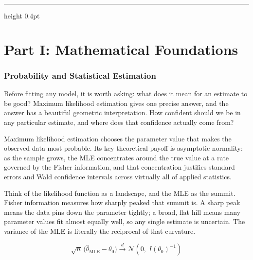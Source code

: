 \documentclass[12pt,a4paper]{article}
\begin{document}
\vspace{10pt}
\hrule height 0.4pt
\vspace{14pt}

\part*{Part I: Mathematical Foundations}

\section*{Probability and Statistical Estimation}

Before fitting any model, it is worth asking: what does it mean for an
estimate to be good? Maximum likelihood estimation gives one precise answer,
and the answer has a beautiful geometric interpretation. How confident should
we be in any particular estimate, and where does that confidence actually
come from?

\begin{concept}
Maximum likelihood estimation chooses the parameter value that makes the
observed data most probable. Its key theoretical payoff is asymptotic
normality: as the sample grows, the MLE concentrates around the true value
at a rate governed by the Fisher information, and that concentration
justifies standard errors and Wald confidence intervals across virtually
all of applied statistics.
\end{concept}

\begin{analogy}
Think of the likelihood function as a landscape, and the MLE as the summit.
Fisher information measures how sharply peaked that summit is. A sharp peak
means the data pins down the parameter tightly; a broad, flat hill means
many parameter values fit almost equally well, so any single estimate is
uncertain. The variance of the MLE is literally the reciprocal of that
curvature.
\end{analogy}

\begin{equation*}
  \sqrt{n}\,\bigl(\hat\theta_{\mathrm{MLE}} - \theta_0\bigr)
  \xrightarrow{d}
  \mathcal{N}\!\left(0,\; I(\theta_0)^{-1}\right)
\end{equation*}
\end{document}
